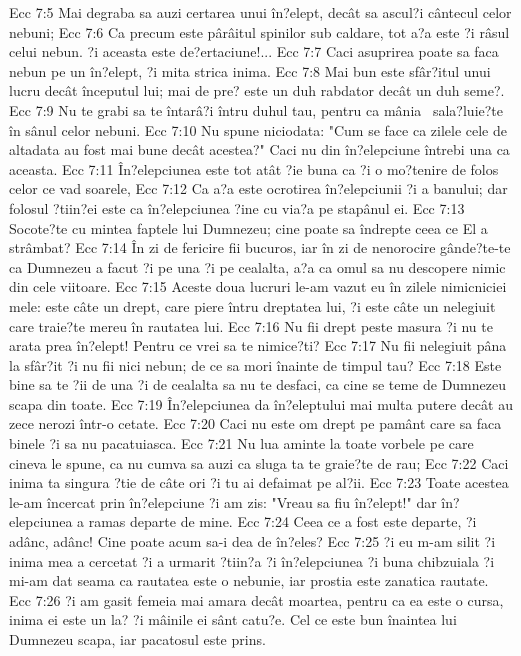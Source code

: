 Ecc 7:5  Mai degraba sa auzi certarea unui în?elept, decât sa ascul?i cântecul celor nebuni;
Ecc 7:6  Ca precum este pârâitul spinilor sub caldare, tot a?a este ?i râsul celui nebun. ?i aceasta este de?ertaciune!...
Ecc 7:7  Caci asuprirea poate sa faca nebun pe un în?elept, ?i mita strica inima.
Ecc 7:8  Mai bun este sfâr?itul unui lucru decât începutul lui; mai de pre? este un duh rabdator decât un duh seme?.
Ecc 7:9  Nu te grabi sa te întarâ?i întru duhul tau, pentru ca mânia  sala?luie?te în sânul celor nebuni.
Ecc 7:10  Nu spune niciodata: "Cum se face ca zilele cele de altadata au fost mai bune decât acestea?" Caci nu din în?elepciune întrebi una ca aceasta.
Ecc 7:11  În?elepciunea este tot atât ?ie buna ca ?i o mo?tenire de folos celor ce vad soarele,
Ecc 7:12  Ca a?a este ocrotirea în?elepciunii ?i a banului; dar folosul ?tiin?ei este ca în?elepciunea ?ine cu via?a pe stapânul ei.
Ecc 7:13  Socote?te cu mintea faptele lui Dumnezeu; cine poate sa îndrepte ceea ce El a strâmbat?
Ecc 7:14  În zi de fericire fii bucuros, iar în zi de nenorocire gânde?te-te ca Dumnezeu a facut ?i pe una ?i pe cealalta, a?a ca omul sa nu descopere nimic din cele viitoare.
Ecc 7:15  Aceste doua lucruri le-am vazut eu în zilele nimicniciei mele: este câte un drept, care piere întru dreptatea lui, ?i este câte un nelegiuit care traie?te mereu în rautatea lui.
Ecc 7:16  Nu fii drept peste masura ?i nu te arata prea în?elept! Pentru ce vrei sa te nimice?ti?
Ecc 7:17  Nu fii nelegiuit pâna la sfâr?it ?i nu fii nici nebun; de ce sa mori înainte de timpul tau?
Ecc 7:18  Este bine sa te ?ii de una ?i de cealalta sa nu te desfaci, ca cine se teme de Dumnezeu scapa din toate.
Ecc 7:19  În?elepciunea da în?eleptului mai multa putere decât au zece nerozi într-o cetate.
Ecc 7:20  Caci nu este om drept pe pamânt care sa faca binele ?i sa nu pacatuiasca.
Ecc 7:21  Nu lua aminte la toate vorbele pe care cineva le spune, ca nu cumva sa auzi ca sluga ta te graie?te de rau;
Ecc 7:22  Caci inima ta singura ?tie de câte ori ?i tu ai defaimat pe al?ii.
Ecc 7:23  Toate acestea le-am încercat prin în?elepciune ?i am zis: "Vreau sa fiu în?elept!" dar în?elepciunea a ramas departe de mine.
Ecc 7:24  Ceea ce a fost este departe, ?i adânc, adânc! Cine poate acum sa-i dea de în?eles?
Ecc 7:25  ?i eu m-am silit ?i inima mea a cercetat ?i a urmarit ?tiin?a ?i în?elepciunea ?i buna chibzuiala ?i mi-am dat seama ca rautatea este o nebunie, iar prostia este zanatica rautate.
Ecc 7:26  ?i am gasit femeia mai amara decât moartea, pentru ca ea este o cursa, inima ei este un la? ?i mâinile ei sânt catu?e. Cel ce este bun înaintea lui Dumnezeu scapa, iar pacatosul este prins.
